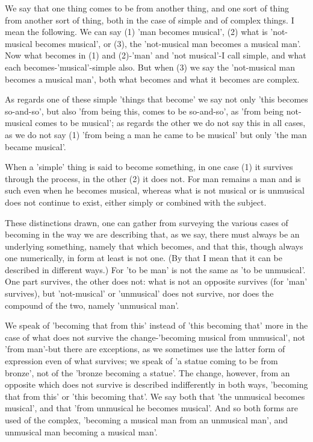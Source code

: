 We say that one thing comes to be from another thing, and one sort
of thing from another sort of thing, both in the case of simple and
of complex things. I mean the following. We can say (1) 'man becomes
musical', (2) what is 'not-musical becomes musical', or (3), the 'not-musical
man becomes a musical man'. Now what becomes in (1) and (2)-'man'
and 'not musical'-I call simple, and what each becomes-'musical'-simple
also. But when (3) we say the 'not-musical man becomes a musical man',
both what becomes and what it becomes are complex. 

As regards one of these simple 'things that become' we say not only
'this becomes so-and-so', but also 'from being this, comes to be so-and-so',
as 'from being not-musical comes to be musical'; as regards the other
we do not say this in all cases, as we do not say (1) 'from being
a man he came to be musical' but only 'the man became musical'.

When a 'simple' thing is said to become something, in one case (1)
it survives through the process, in the other (2) it does not. For
man remains a man and is such even when he becomes musical, whereas
what is not musical or is unmusical does not continue to exist, either
simply or combined with the subject. 

These distinctions drawn, one can gather from surveying the various
cases of becoming in the way we are describing that, as we say, there
must always be an underlying something, namely that which becomes,
and that this, though always one numerically, in form at least is
not one. (By that I mean that it can be described in different ways.)
For 'to be man' is not the same as 'to be unmusical'. One part survives,
the other does not: what is not an opposite survives (for 'man' survives),
but 'not-musical' or 'unmusical' does not survive, nor does the compound
of the two, namely 'unmusical man'. 

We speak of 'becoming that from this' instead of 'this becoming that'
more in the case of what does not survive the change-'becoming musical
from unmusical', not 'from man'-but there are exceptions, as we sometimes
use the latter form of expression even of what survives; we speak
of 'a statue coming to be from bronze', not of the 'bronze becoming
a statue'. The change, however, from an opposite which does not survive
is described indifferently in both ways, 'becoming that from this'
or 'this becoming that'. We say both that 'the unmusical becomes musical',
and that 'from unmusical he becomes musical'. And so both forms are
used of the complex, 'becoming a musical man from an unmusical man',
and unmusical man becoming a musical man'. 

